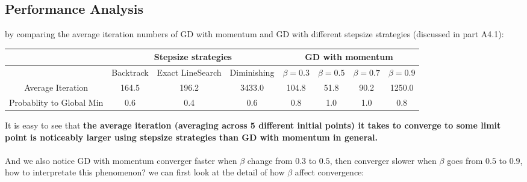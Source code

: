 \documentclass{article}
\newcommand{\subs}[1]{\subsection*{#1}}
\begin{document}
\subs{Performance Analysis}
by comparing the average iteration numbers of GD with momentum and GD with different stepsize strategies (discussed in part A4.1):
\begin{center}
  \begin{tabular}{c|ccc|cccc}
    \hline
    \multicolumn{1}{c}{} & \multicolumn{3}{c}{Stepsize strategies} & \multicolumn{4}{c}{GD with momentum}\\
    \hline
    &Backtrack & Exact LineSearch & Diminishing & $\beta = 0.3$ & $\beta = 0.5$ & $\beta = 0.7$ & $\beta = 0.9$\\
    \hline
    Average Iteration & 164.5 & 196.2 & 3433.0 & 104.8& 51.8 & 90.2 & 1250.0\\
    \hline
    Probablity to Global Min & 0.6 & 0.4 & 0.6 & 0.8 & 1.0 & 1.0 &0.8\\
    \hline
  \end{tabular}
\end{center}
It is easy to see that \textbf{the average iteration (averaging across 5 different initial points) it takes to converge to some limit point is noticeably larger using stepsize strategies than GD with momentum in general.}  \\
\\
And we also notice GD with momentum converger faster when $\beta$ change from $0.3$ to $0.5$, then converger slower when $\beta$ goes from $0.5$ to $0.9$, how to interpretate this phenomenon? we can first look at the detail of how $\beta$ affect convergence: 
\end{document}
